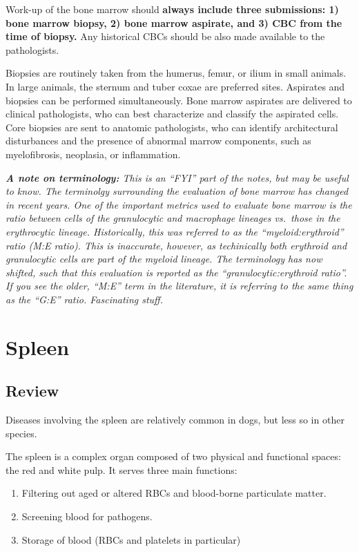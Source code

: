 \documentclass[openany]{article}
\providecommand{\tightlist}{%
  \setlength{\itemsep}{0pt}\setlength{\parskip}{0pt}}
\begin{document}
Work-up of the bone marrow should \textbf{always include three
submissions: 1) bone marrow biopsy, 2) bone marrow aspirate, and 3) CBC
from the time of biopsy.} Any historical CBCs should be also made
available to the pathologists.

Biopsies are routinely taken from the humerus, femur, or ilium in small
animals. In large animals, the sternum and tuber coxae are preferred
sites. Aspirates and biopsies can be performed simultaneously. Bone
marrow aspirates are delivered to clinical pathologists, who can best
characterize and classify the aspirated cells. Core biopsies are sent to
anatomic pathologists, who can identify architectural disturbances and
the presence of abnormal marrow components, such as myelofibrosis,
neoplasia, or inflammation.

\emph{\textbf{A note on terminology:} This is an ``FYI'' part of the
notes, but may be useful to know. The terminolgy surrounding the
evaluation of bone marrow has changed in recent years. One of the
important metrics used to evaluate bone marrow is the ratio between
cells of the granulocytic and macrophage lineages vs.~those in the
erythrocytic lineage. Historically, this was referred to as the
``myeloid:erythroid'' ratio (M:E ratio). This is inaccurate, however, as
techinically both erythroid and granulocytic cells are part of the
myeloid lineage. The terminology has now shifted, such that this
evaluation is reported as the ``granulocytic:erythroid ratio''. If you
see the older, ``M:E'' term in the literature, it is referring to the
same thing as the ``G:E'' ratio. Fascinating stuff.}

\section{Spleen}\label{spleen}

\subsection{Review}\label{review}

Diseases involving the spleen are relatively common in dogs, but less so
in other species.

The spleen is a complex organ composed of two physical and functional
spaces: the red and white pulp. It serves three main functions:

\begin{enumerate}
\def\labelenumi{\arabic{enumi}.}
\tightlist
\item
  Filtering out aged or altered RBCs and blood-borne particulate matter.
\item
  Screening blood for pathogens.
\item
  Storage of blood (RBCs and platelets in particular)
\end{enumerate}
\end{document}
